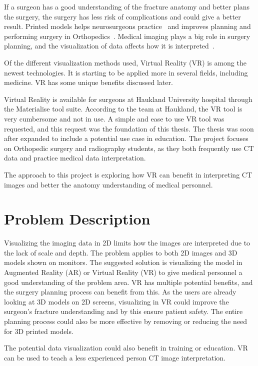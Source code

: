 \documentclass[a4paper]{report}
\begin{document}
If a surgeon has a good understanding of the fracture anatomy and better plans the surgery,
the surgery has less risk of complications and could give a better result.
Printed models helps neurosurgeons practice~\cite{shahrubudin_overview_2019} and improves planning and performing surgery in Orthopedics~\cite{chen_efficacy_2019}.
Medical imaging plays a big role in surgery planning, and the visualization of data affects how it is interpreted~\cite{bradley_history_2008}.

Of the different visualization methods used, Virtual Reality (VR) is among the newest technologies. It is starting to be applied more in several fields, including medicine. VR has some unique benefits discussed later.

Virtual Reality is available for surgeons at Haukland University hospital through the Materialise tool suite. According to the team at Haukland, the VR tool is very cumbersome and not in use. A simple and ease to use VR tool was requested, and this request was the foundation of this thesis. The thesis was soon after expanded to include a potential use case in education. The project focuses on Orthopedic surgery and radiography students, as they both frequently use CT data and practice medical data interpretation.

The approach to this project is exploring how VR can benefit in interpreting CT images and better the anatomy understanding of medical personnel.


\section{Problem Description}
Visualizing the imaging data in 2D limits how the images are interpreted due to the lack of scale and depth. The problem applies to both 2D images and 3D models shown on monitors.
The suggested solution is visualizing the model in Augmented Reality (AR) or Virtual Reality (VR) to give medical personnel a good understanding of the problem area.
VR has multiple potential benefits, and the surgery planning process can benefit from this. As the users are already looking at 3D models on 2D screens, visualizing in VR could improve the surgeon's fracture understanding and by this ensure patient safety.
The entire planning process could also be more effective by removing or reducing the need for 3D printed models.

The potential data visualization could also benefit in training or education. VR can be used to teach a less experienced person CT image interpretation.
\end{document}
